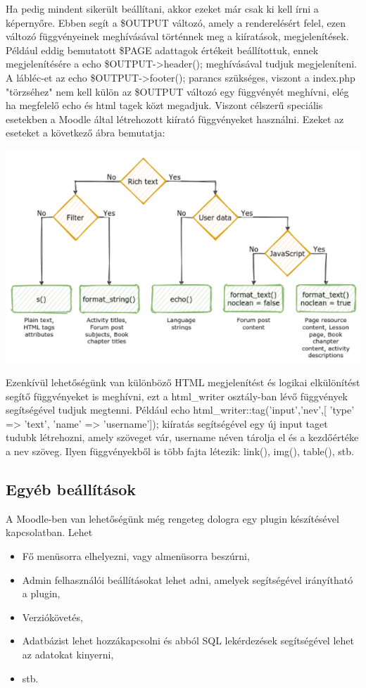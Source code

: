 Ha pedig mindent sikerült beállítani, akkor ezeket már csak ki kell írni a képernyőre. Ebben segít a \$OUTPUT változó, amely a renderelésért felel, ezen változó függvényeinek meghívásával történnek meg a kiíratások, megjelenítések. Például eddig bemutatott \$PAGE adattagok értékeit beállítottuk, ennek megjelenítésére a 
\hfill \break
echo \$OUTPUT->header();
\hfill \break
meghívásával tudjuk megjeleníteni. A lábléc-et az
\hfill \break
echo \$OUTPUT->footer();
\hfill \break
parancs szükséges, viszont a index.php "törzséhez" nem kell külön az \$OUTPUT változó egy függvényét meghívni, elég ha megfelelő echo és html tagek közt megadjuk. Viszont célszerű speciális esetekben a Moodle által létrehozott kiírató függvényeket használni. Ezeket az eseteket a következő ábra bemutatja:

\begin{center}
    \includegraphics[scale=0.9]{Fejezetek/Images/print.png}
\end{center}

Ezenkívül lehetőségünk van különböző HTML megjelenítést és logikai elkülönítést segítő függvényeket is meghívni, ezt a html\_writer osztály-ban lévő függvények segítségével tudjuk megtenni. Például
\hfill \break
echo html\_writer::tag('input','nev',[ 'type' => 'text', 'name' => 'username']); 
\hfill \break
kiíratás segítségével egy új input taget tudubk létrehozni, amely szöveget vár, username néven tárolja el és a kezdőértéke a nev szöveg. Ilyen függvényekből is több fajta létezik: link(), img(), table(), stb.

\subsection{Egyéb beállítások}

A Moodle-ben van lehetőségünk még rengeteg dologra egy plugin készítésével kapcsolatban. Lehet
\begin{itemize}
    \item Fő menüsorra elhelyezni, vagy almenüsorra beszúrni,
    \item Admin felhasználói beállításokat lehet adni, amelyek segítségével irányítható a plugin,
    \item Verziókövetés, 
    \item Adatbázist lehet hozzákapcsolni és abból SQL lekérdezések segítségével lehet az adatokat kinyerni,
    \item stb.
\end{itemize}

